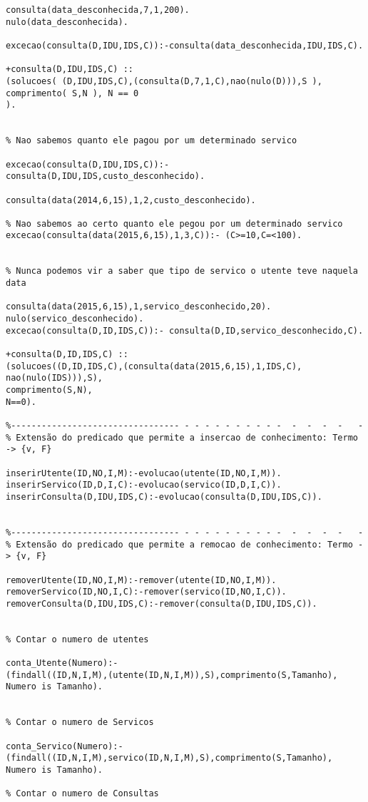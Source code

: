 \documentclass[pdftex,12pt,a4paper]{report}
\begin{document}
\begin{appendices}
\begin{verbatim}
consulta(data_desconhecida,7,1,200). 
nulo(data_desconhecida).

excecao(consulta(D,IDU,IDS,C)):-consulta(data_desconhecida,IDU,IDS,C).

+consulta(D,IDU,IDS,C) :: 
(solucoes( (D,IDU,IDS,C),(consulta(D,7,1,C),nao(nulo(D))),S ),
comprimento( S,N ), N == 0 
).


% Nao sabemos quanto ele pagou por um determinado servico

excecao(consulta(D,IDU,IDS,C)):- 
consulta(D,IDU,IDS,custo_desconhecido).

consulta(data(2014,6,15),1,2,custo_desconhecido).

% Nao sabemos ao certo quanto ele pegou por um determinado servico
excecao(consulta(data(2015,6,15),1,3,C)):- (C>=10,C=<100).


% Nunca podemos vir a saber que tipo de servico o utente teve naquela data 

consulta(data(2015,6,15),1,servico_desconhecido,20).
nulo(servico_desconhecido).
excecao(consulta(D,ID,IDS,C)):- consulta(D,ID,servico_desconhecido,C).

+consulta(D,ID,IDS,C) :: 
(solucoes((D,ID,IDS,C),(consulta(data(2015,6,15),1,IDS,C),
nao(nulo(IDS))),S),
comprimento(S,N),
N==0).

%--------------------------------- - - - - - - - - - -  -  -  -  -   -
% Extensão do predicado que permite a insercao de conhecimento: Termo -> {v, F}

inserirUtente(ID,NO,I,M):-evolucao(utente(ID,NO,I,M)).
inserirServico(ID,D,I,C):-evolucao(servico(ID,D,I,C)).
inserirConsulta(D,IDU,IDS,C):-evolucao(consulta(D,IDU,IDS,C)).


%--------------------------------- - - - - - - - - - -  -  -  -  -   -
% Extensão do predicado que permite a remocao de conhecimento: Termo -> {v, F}

removerUtente(ID,NO,I,M):-remover(utente(ID,NO,I,M)).
removerServico(ID,NO,I,C):-remover(servico(ID,NO,I,C)).
removerConsulta(D,IDU,IDS,C):-remover(consulta(D,IDU,IDS,C)).


% Contar o numero de utentes

conta_Utente(Numero):-
(findall((ID,N,I,M),(utente(ID,N,I,M)),S),comprimento(S,Tamanho), 
Numero is Tamanho).


% Contar o numero de Servicos

conta_Servico(Numero):-
(findall((ID,N,I,M),servico(ID,N,I,M),S),comprimento(S,Tamanho), 
Numero is Tamanho).

% Contar o numero de Consultas


\end{verbatim}
\end{appendices}
\end{document}
